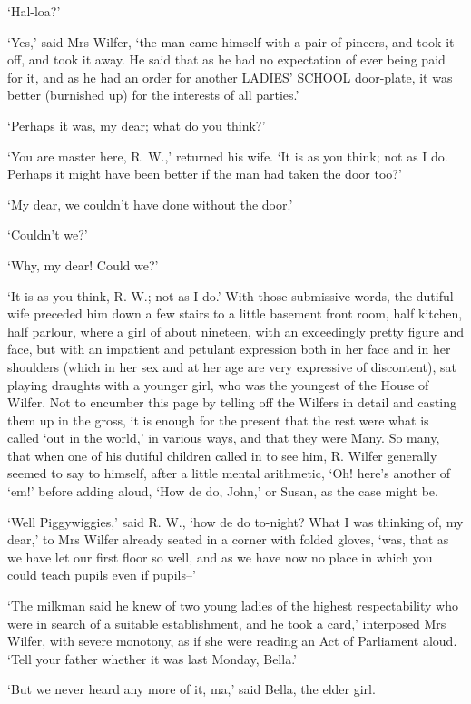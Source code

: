 ‘Hal-loa?’

‘Yes,’ said Mrs Wilfer, ‘the man came himself with a pair of pincers,
and took it off, and took it away. He said that as he had no expectation
of ever being paid for it, and as he had an order for another LADIES’
SCHOOL door-plate, it was better (burnished up) for the interests of all
parties.’

‘Perhaps it was, my dear; what do you think?’

‘You are master here, R. W.,’ returned his wife. ‘It is as you think;
not as I do. Perhaps it might have been better if the man had taken the
door too?’

‘My dear, we couldn’t have done without the door.’

‘Couldn’t we?’

‘Why, my dear! Could we?’

‘It is as you think, R. W.; not as I do.’ With those submissive words,
the dutiful wife preceded him down a few stairs to a little basement
front room, half kitchen, half parlour, where a girl of about nineteen,
with an exceedingly pretty figure and face, but with an impatient and
petulant expression both in her face and in her shoulders (which in
her sex and at her age are very expressive of discontent), sat playing
draughts with a younger girl, who was the youngest of the House of
Wilfer. Not to encumber this page by telling off the Wilfers in detail
and casting them up in the gross, it is enough for the present that the
rest were what is called ‘out in the world,’ in various ways, and that
they were Many. So many, that when one of his dutiful children called in
to see him, R. Wilfer generally seemed to say to himself, after a little
mental arithmetic, ‘Oh! here’s another of ‘em!’ before adding aloud,
‘How de do, John,’ or Susan, as the case might be.

‘Well Piggywiggies,’ said R. W., ‘how de do to-night? What I was
thinking of, my dear,’ to Mrs Wilfer already seated in a corner with
folded gloves, ‘was, that as we have let our first floor so well, and as
we have now no place in which you could teach pupils even if pupils--’

‘The milkman said he knew of two young ladies of the highest
respectability who were in search of a suitable establishment, and he
took a card,’ interposed Mrs Wilfer, with severe monotony, as if she
were reading an Act of Parliament aloud. ‘Tell your father whether it
was last Monday, Bella.’

‘But we never heard any more of it, ma,’ said Bella, the elder girl.

